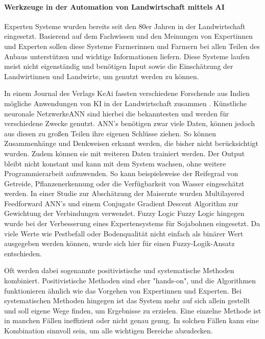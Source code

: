 \paragraph{Werkzeuge in der Automation von Landwirtschaft mittels AI}\cite{jha2019comprehensive}
Experten Systeme wurden bereits seit den 80er Jahren in der Landwirtschaft eingesetzt. Basierend auf dem Fachwissen und den Meinungen von Expertinnen und Experten sollen diese Systeme Farmerinnen und Farmern bei allen Teilen des Anbaus unterstützen und wichtige Informationen liefern. Diese Systeme laufen meist nicht eigenständig und benötigen Input sowie die Einschätzung der Landwirtinnen und Landwirte, um genutzt werden zu können.

In einem Journal des Verlags KeAi fassten verschiedene Forschende aus Indien mögliche Anwendungen von KI in der Landwirtschaft zusammen . Künstliche neuronale Netzwerke\gls{ANN} sind hierbei die bekanntesten und werden für verschiedene Zwecke genutzt. ANN's benötigen zwar viele Daten, können jedoch aus diesen zu großen Teilen ihre eigenen Schlüsse ziehen. So können Zusammenhänge und Denkweisen erkannt werden, die bisher nicht berücksichtigt wurden. Zudem können sie mit weiteren Daten trainiert werden. Der Output bleibt nicht konstant und kann mit dem System wachsen, ohne weitere Programmierarbeit aufzuwenden. So kann beispielsweise der Reifegrad von Getreide, Pflanzenerkennung oder die Verfügbarkeit von Wasser eingeschätzt werden. In einer Studie zur Abschätzung der Maisernte wurden Multilayered Feedforward ANN's und einem Conjugate Gradient Descent Algorithm zur Gewichtung der Verbindungen verwendet.\cite{singh2008artificial} Fuzzy Logic \gls{Fuzzy Logic} hingegen wurde bei der Verbesserung eines Expertensystems für Sojabohnen eingesetzt. Da viele Werte wie Pestbefall oder Bodenqualität nicht einfach als binärer Wert ausgegeben werden können, wurde sich hier für einen Fuzzy-Logik-Ansatz entschieden.\cite{prakash2013fuzzy}

Oft werden dabei sogenannte positivistische und systematische Methoden kombiniert. Positivistische Methoden sind eher "hands-on", und die Algorithmen funktionieren ähnlich wie das Vorgehen von Expertinnen und Experten. Bei systematischen Methoden hingegen ist das System mehr auf sich allein gestellt und soll eigene Wege finden, um Ergebnisse zu erzielen. Eine einzelne Methode ist in manchen Fällen ineffizient oder nicht genau genug. In solchen Fällen kann eine Kombination sinnvoll sein, um alle wichtigen Bereiche abzudecken.

